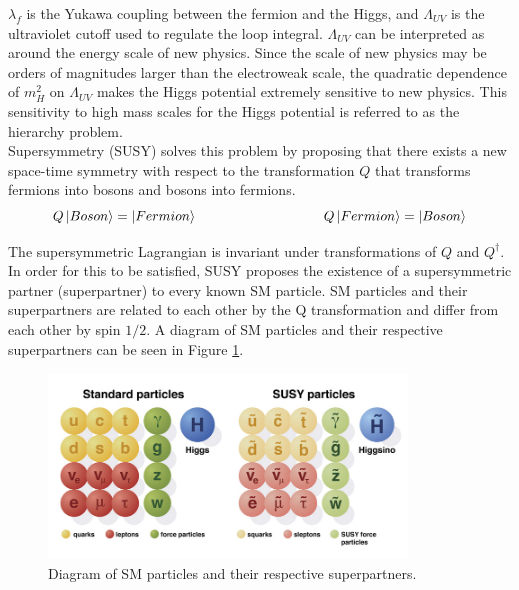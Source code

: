 \indent $\lambda_f$ is the Yukawa coupling between the fermion and the Higgs, and $\Lambda_{UV}$ is the ultraviolet cutoff used to regulate the loop integral.  $\Lambda_{UV}$ can be interpreted as around the energy scale of new physics.  Since the scale of new physics may be orders of magnitudes larger than the electroweak scale, the quadratic dependence of $m_H^2$ on $\Lambda_{UV}$ makes the Higgs potential extremely sensitive to new physics. This sensitivity to high mass scales for the Higgs potential is referred to as the hierarchy problem.  \\ %

\indent Supersymmetry (SUSY) solves this problem by proposing that there exists a new space-time symmetry with respect to the transformation $Q$ that transforms fermions into bosons and bosons into fermions.\\

\begin{equation}
\label{eqn:Higgs:Loopf}
Q\ket{Boson} = \ket{Fermion} ~~~~~~~~~~~~~~~~~~~~~~~~~~~~ Q\ket{Fermion} = \ket{Boson}
\end{equation}

\indent The supersymmetric Lagrangian is invariant under transformations of $Q$ and $Q^{\dagger}$.  In order for this to be satisfied, SUSY proposes the existence of a supersymmetric partner (superpartner) to every known SM particle.  SM particles and their superpartners are related to each other by the Q transformation and differ from each other by spin $1/2$. A diagram of SM particles and their respective superpartners can be seen in Figure \ref{fig:SUSYpart2}.  \\

\begin{figure}[h!]
\centering
    \includegraphics[width=0.85\textwidth]{figures/strategy/SUSYparticles.jpg}\hspace{0.05\textwidth}
\caption[Diagram of SM particles and their respective superpartners]{ Diagram of SM particles and their respective superpartners. }
\label{fig:SUSYpart2}
\end{figure}

